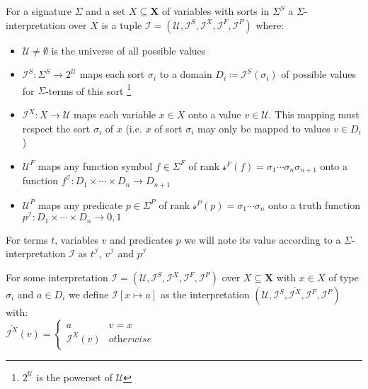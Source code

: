 \begin{definition}
For a signature $\Sigma$ and a set $X\subseteq\mathbf{X}$ of variables with sorts in $\Sigma^S$ a $\Sigma$-interpretation over $X$ is a tuple
$\mathcal{I}=\left(\mathcal{U},\mathcal{I}^S, \mathcal{I}^X, \mathcal{I}^F, \mathcal{I}^P\right)$
where:
\begin{itemize}
    \item $\mathcal{U}\neq\emptyset$ is the universe of all possible values
    \item $\mathcal{I}^S\colon\Sigma^S\to2^\mathcal{U}$ 
        maps each sort $\sigma_i$ to a domain $D_i\coloneqq\mathcal{I}^S\left(\sigma_i\right)$ of possible values for $\Sigma$-terms of this sort
        \footnote{$2^\mathcal{U}$ is the powerset of $\mathcal{U}$}
    \item $\mathcal{I}^X\colon X\to \mathcal{U}$ maps each variable $x\in X$ onto a value $v\in\mathcal{U}$. This mapping must respect the sort $\sigma_i$ of $x$ (i.e. $x$ of sort $\sigma_i$ may only be mapped to values $v\in D_i$)
    \item $\mathcal{U}^F$ maps any function symbol $f\in\Sigma^F$ of rank  $\mathcal{s}^F\left(f\right)=\sigma_1\dotsi\sigma_n\sigma_{n+1}$ onto a function $f^\mathcal{I}\colon D_1\times\dotsi\times D_n \to D_{n+1}$
    \item $\mathcal{U}^P$ maps any predicate $p\in\Sigma^P$ of rank $\mathcal{s}^P\left(p\right)=\sigma_1\dotsi\sigma_n$ onto a truth function $p^\mathcal{I}\colon D_1\times\dotsi\times D_n \to {0,1}$
\end{itemize}
\end{definition}
For terms $t$, variables $v$ and predicates $p$ we will note its value according to a $\Sigma$-interpretation $\mathcal{I}$ as $t^\mathcal{I}$, $v^\mathcal{I}$ and $p^\mathcal{I}$

\begin{definition}[Substitution]
For some interpretation $\mathcal{I}=\left(\mathcal{U},\mathcal{I}^S, \mathcal{I}^X, \mathcal{I}^F, \mathcal{I}^P\right)$ over $X\subseteq\mathbf{X}$ with $x\in X$ of type $\sigma_i$ and $a\in D_i$ we define $\mathcal{I}\left[x\mapsto a\right]$ as the interpretation $\left(\mathcal{U},\mathcal{I}^S, \overline{\mathcal{I}^X}, \mathcal{I}^F, \mathcal{I}^P\right)$ with:\\
$\overline{\mathcal{I}^X}(v)=
\begin{cases}
a & v=x\\
\mathcal{I}^X(v) & \textit{otherwise}
\end{cases}$
\end{definition}

